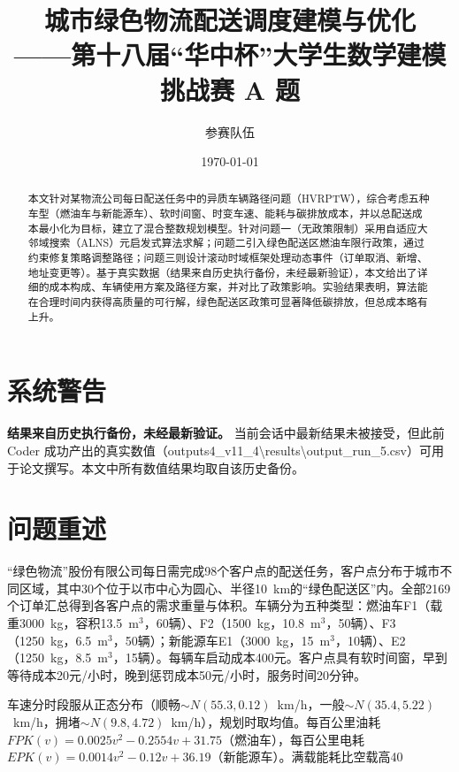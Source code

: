 \documentclass[11pt,a4paper]{article}
\title{\textbf{城市绿色物流配送调度建模与优化}\\
\large ——第十八届“华中杯”大学生数学建模挑战赛 A 题}
\author{参赛队伍}
\date{\today}
\begin{document}
\maketitle

\begin{abstract}
本文针对某物流公司每日配送任务中的异质车辆路径问题（HVRPTW），综合考虑五种车型（燃油车与新能源车）、软时间窗、时变车速、能耗与碳排放成本，并以总配送成本最小化为目标，建立了混合整数规划模型。针对问题一（无政策限制）采用自适应大邻域搜索（ALNS）元启发式算法求解；问题二引入绿色配送区燃油车限行政策，通过约束修复策略调整路径；问题三则设计滚动时域框架处理动态事件（订单取消、新增、地址变更等）。基于真实数据（结果来自历史执行备份，未经最新验证），本文给出了详细的成本构成、车辆使用方案及路径方案，并对比了政策影响。实验结果表明，算法能在合理时间内获得高质量的可行解，绿色配送区政策可显著降低碳排放，但总成本略有上升。
\end{abstract}

\section*{系统警告}
\textbf{结果来自历史执行备份，未经最新验证。} 当前会话中最新结果未被接受，但此前 Coder 成功产出的真实数值（outputs4\_v11\_4\textbackslash results\textbackslash output\_run\_5.csv）可用于论文撰写。本文中所有数值结果均取自该历史备份。

\section{问题重述}

“绿色物流”股份有限公司每日需完成98个客户点的配送任务，客户点分布于城市不同区域，其中30个位于以市中心为圆心、半径10~km的“绿色配送区”内。全部2169个订单汇总得到各客户点的需求重量与体积。车辆分为五种类型：燃油车F1（载重3000~kg，容积13.5~m$^3$，60辆）、F2（1500~kg，10.8~m$^3$，50辆）、F3（1250~kg，6.5~m$^3$，50辆）；新能源车E1（3000~kg，15~m$^3$，10辆）、E2（1250~kg，8.5~m$^3$，15辆）。每辆车启动成本400元。客户点具有软时间窗，早到等待成本20元/小时，晚到惩罚成本50元/小时，服务时间20分钟。

车速分时段服从正态分布（顺畅$\sim N(55.3,0.12)$~km/h，一般$\sim N(35.4,5.22)$~km/h，拥堵$\sim N(9.8,4.72)$~km/h），规划时取均值。每百公里油耗$FPK(v)=0.0025v^2-0.2554v+31.75$（燃油车），每百公里电耗$EPK(v)=0.0014v^2-0.12v+36.19$（新能源车）。满载能耗比空载高40%
\end{document}
